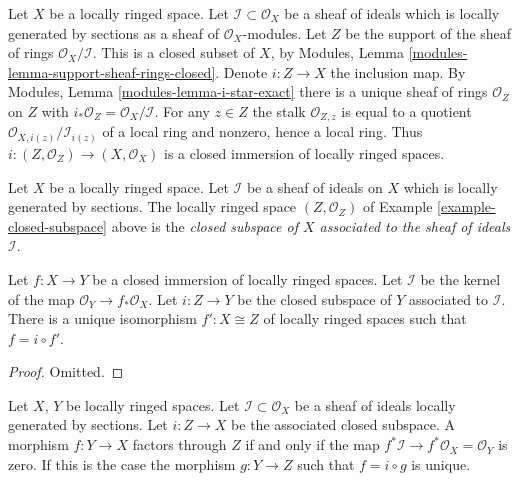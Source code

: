 \begin{example}
\label{example-closed-subspace}
Let $X$ be a locally ringed space.
Let $\mathcal{I} \subset \mathcal{O}_X$ be a sheaf
of ideals which is locally generated by sections as a sheaf
of $\mathcal{O}_X$-modules. Let $Z$ be the support of
the sheaf of rings $\mathcal{O}_X/\mathcal{I}$.
This is a closed subset of $X$, by
Modules, Lemma \ref{modules-lemma-support-sheaf-rings-closed}.
Denote $i : Z \to X$ the inclusion map.
By Modules, Lemma \ref{modules-lemma-i-star-exact}
there is a unique sheaf of rings $\mathcal{O}_Z$ on $Z$
with $i_*\mathcal{O}_Z = \mathcal{O}_X/\mathcal{I}$.
For any $z \in Z$ the stalk $\mathcal{O}_{Z, z}$
is equal to a quotient $\mathcal{O}_{X, i(z)}/\mathcal{I}_{i(z)}$
of a local ring and nonzero, hence a local ring.
Thus $i : (Z, \mathcal{O}_Z) \to (X, \mathcal{O}_X)$ is
a closed immersion of locally ringed spaces.
\end{example}

\begin{definition}
\label{definition-closed-subspace}
Let $X$ be a locally ringed space.
Let $\mathcal{I}$ be a sheaf of ideals on $X$
which is locally generated by sections.
The locally ringed space $(Z, \mathcal{O}_Z)$
of Example \ref{example-closed-subspace} above
is the {\it closed subspace of $X$ associated to
the sheaf of ideals $\mathcal{I}$}.
\end{definition}

\begin{lemma}
\label{lemma-closed-immersion}
Let $f : X \to Y$ be a closed immersion of
locally ringed spaces. Let $\mathcal{I}$ be the
kernel of the map $\mathcal{O}_Y \to f_*\mathcal{O}_X$.
Let $i : Z \to Y$ be the closed subspace of $Y$
associated to $\mathcal{I}$.
There is a unique isomorphism $f' : X \cong Z$ of
locally ringed spaces such that $f = i \circ f'$.
\end{lemma}

\begin{proof}
Omitted.
\end{proof}

\begin{lemma}
\label{lemma-characterize-closed-subspace}
Let $X$, $Y$ be locally ringed spaces. Let
$\mathcal{I} \subset \mathcal{O}_X$ be a sheaf of ideals locally generated
by sections. Let $i : Z \to X$ be the associated closed subspace.
A morphism $f : Y \to X$ factors through $Z$ if and only if the map
$f^*\mathcal{I} \to f^*\mathcal{O}_X = \mathcal{O}_Y$
is zero. If this is the case the morphism $g : Y \to Z$
such that $f = i \circ g$ is unique.
\end{lemma}

